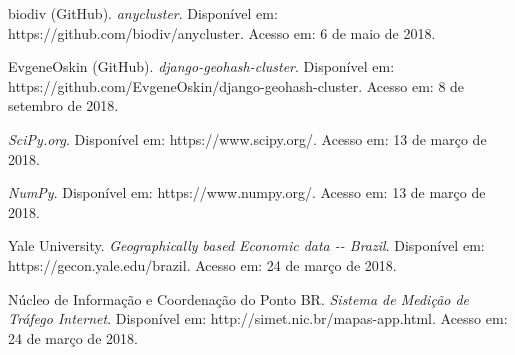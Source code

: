 \documentclass[]{politex}
\begin{document}
\begin{thebibliography}{9}
    biodiv (GitHub).
    \textit{anycluster}.
    Disponível em: https://github.com/biodiv/anycluster.
    Acesso em: 6 de maio de 2018.

    EvgeneOskin (GitHub).
    \textit{django-geohash-cluster}.
    Disponível em: https://github.com/EvgeneOskin/django-geohash-cluster.
    Acesso em: 8 de setembro de 2018.

    \textit{SciPy.org}.
    Disponível em: https://www.scipy.org/.
    Acesso em: 13 de março de 2018.

    \textit{NumPy}.
    Disponível em: https://www.numpy.org/.
    Acesso em: 13 de março de 2018.

    Yale University.
    \textit{Geographically based Economic data -{}- Brazil}.
    Disponível em: https://gecon.yale.edu/brazil.
    Acesso em: 24 de março de 2018.

    Núcleo de Informação e Coordenação do Ponto BR.
    \textit{Sistema de Medição de Tráfego Internet}.
    Disponível em: http://simet.nic.br/mapas-app.html.
    Acesso em: 24 de março de 2018.

\end{thebibliography}
\apendice


\anexo
\end{document}
